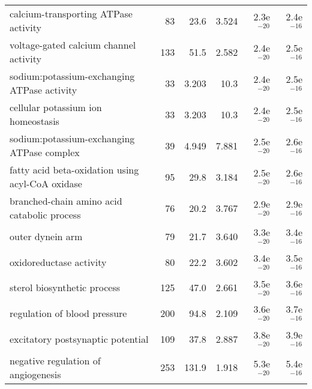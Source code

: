 \begin{longtable}{lrrrrr}
              calcium-transporting ATPase activity &                      83 &                    23.6 &      3.524 &         2.3e$^{-20}$ &         2.4e$^{-16}$ \\
            voltage-gated calcium channel activity &                     133 &                    51.5 &      2.582 &         2.4e$^{-20}$ &         2.5e$^{-16}$ \\
       sodium:potassium-exchanging ATPase activity &                      33 &                   3.203 &       10.3 &         2.4e$^{-20}$ &         2.5e$^{-16}$ \\
                cellular potassium ion homeostasis &                      33 &                   3.203 &       10.3 &         2.4e$^{-20}$ &         2.5e$^{-16}$ \\
        sodium:potassium-exchanging ATPase complex &                      39 &                   4.949 &      7.881 &         2.5e$^{-20}$ &         2.6e$^{-16}$ \\
  fatty acid beta-oxidation using acyl-CoA oxidase &                      95 &                    29.8 &      3.184 &         2.5e$^{-20}$ &         2.6e$^{-16}$ \\
       branched-chain amino acid catabolic process &                      76 &                    20.2 &      3.767 &         2.9e$^{-20}$ &         2.9e$^{-16}$ \\
                                  outer dynein arm &                      79 &                    21.7 &      3.640 &         3.3e$^{-20}$ &         3.4e$^{-16}$ \\
                           oxidoreductase activity &                      80 &                    22.2 &      3.602 &         3.4e$^{-20}$ &         3.5e$^{-16}$ \\
                       sterol biosynthetic process &                     125 &                    47.0 &      2.661 &         3.5e$^{-20}$ &         3.6e$^{-16}$ \\
                      regulation of blood pressure &                     200 &                    94.8 &      2.109 &         3.6e$^{-20}$ &         3.7e$^{-16}$ \\
                 excitatory postsynaptic potential &                     109 &                    37.8 &      2.887 &         3.8e$^{-20}$ &         3.9e$^{-16}$ \\
               negative regulation of angiogenesis &                     253 &                   131.9 &      1.918 &         5.3e$^{-20}$ &         5.4e$^{-16}$ \\

\end{longtable}
